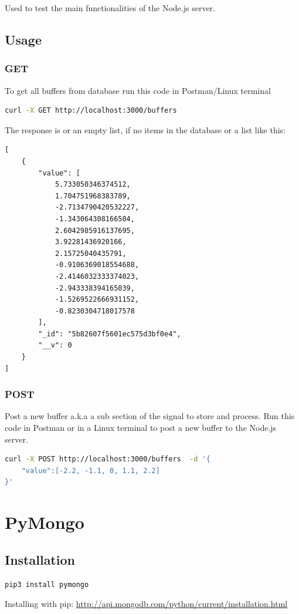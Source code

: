 \documentclass[12pt, a4paper, portrait]{article}
\begin{document}
Used to test the main functionalities of the Node.js server.

\subsection{Usage}
\subsubsection{GET}
To get all buffers from database run this code in Postman/Linux terminal
\begin{lstlisting}[language=bash, caption=Get all buffers]
curl -X GET http://localhost:3000/buffers
\end{lstlisting}

The response is or an empty list, if no items in the database or a list like this:
\begin{lstlisting}[language=XML, caption=A sub section of the signal to process]
[
    {
        "value": [
            5.733050346374512,
            1.704751968383789,
            -2.7134790420532227,
            -1.343064308166504,
            2.6042985916137695,
            3.92281436920166,
            2.15725040435791,
            -0.9106369018554688,
            -2.4146032333374023,
            -2.943338394165039,
            -1.5269522666931152,
            -0.8230304718017578
        ],
        "_id": "5b82607f5601ec575d3bf0e4",
        "__v": 0
    }
]
\end{lstlisting}

\subsubsection{POST}
Post a new buffer a.k.a a sub section of the signal to store and process. Run this code in Postman or in a Linux terminal to post a new buffer to the Node.js server.
\begin{lstlisting}[language=bash, caption=Send signal data via REST]
curl -X POST http://localhost:3000/buffers  -d '{
	"value":[-2.2, -1.1, 0, 1.1, 2.2]
}'
\end{lstlisting}

\pagebreak
\section{PyMongo}
\subsection{Installation}
\begin{lstlisting}[language=bash]
pip3 install pymongo
\end{lstlisting}
Installing with pip: \url{http://api.mongodb.com/python/current/installation.html}
\end{document}
